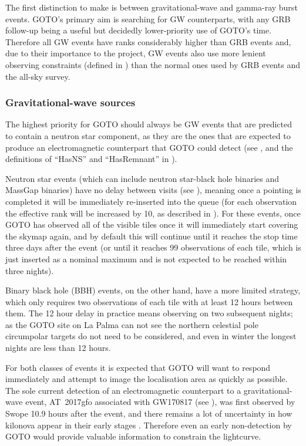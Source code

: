 \begin{colsection}
The first distinction to make is between gravitational-wave and gamma-ray burst events. GOTO's primary aim is searching for GW counterparts, with any GRB follow-up being a useful but decidedly lower-priority use of GOTO's time. Therefore all GW events have ranks considerably higher than GRB events and, due to their importance to the project, GW events also use more lenient observing constraints (defined in ) than the normal ones used by GRB events and the all-sky survey.

\subsubsection{Gravitational-wave sources}

The highest priority for GOTO should always be GW events that are predicted to contain a neutron star component, as they are the ones that are expected to produce an electromagnetic counterpart that GOTO could detect (see , and the definitions of ``HasNS'' and ``HasRemnant'' in ).

Neutron star events (which can include neutron star-black hole binaries and MassGap binaries) have no delay between visits (see ), meaning once a pointing is completed it will be immediately re-inserted into the queue (for each observation the effective rank will be increased by 10, as described in ). For these events, once GOTO has observed all of the visible tiles once it will immediately start covering the skymap again, and by default this will continue until it reaches the stop time three days after the event (or until it reaches 99 observations of each tile, which is just inserted as a nominal maximum and is not expected to be reached within three nights).

Binary black hole (BBH) events, on the other hand, have a more limited  strategy, which only requires two observations of each tile with at least 12 hours between them. The 12 hour delay in practice means observing on two subsequent nights; as the GOTO site on La Palma can not see the northern celestial pole circumpolar targets do not need to be considered, and even in winter the longest nights are less than 12 hours.

\newpage

For both classes of events it is expected that GOTO will want to respond immediately and attempt to image the localisation area as quickly as possible. The sole current detection of an electromagnetic counterpart to a gravitational-wave event, AT~2017gfo associated with GW170817 (see ), was first observed by Swope 10.9 hours after the event, and there remains a lot of uncertainty in how kilonova appear in their early stages \citep{GW_kilonova_early}. Therefore even an early non-detection by GOTO would provide valuable information to constrain the lightcurve.


\end{colsection}

